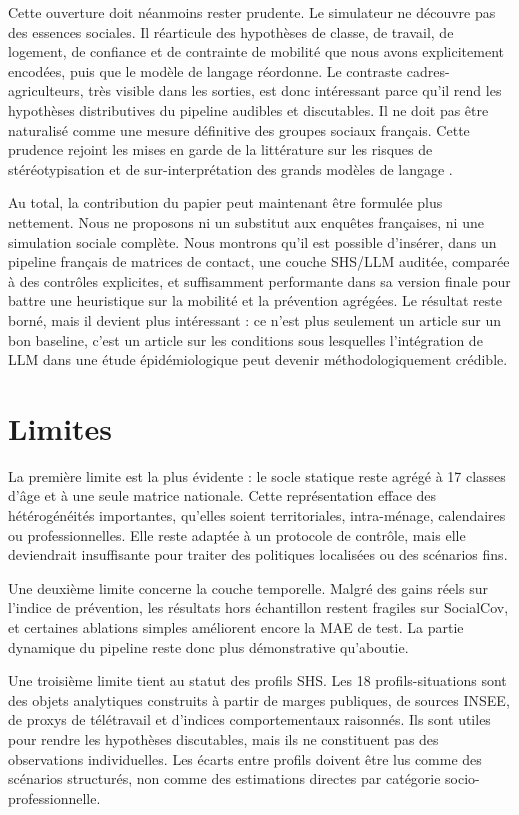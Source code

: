 \documentclass[ROIA,Unicode]{cedram}
\begin{document}
Cette ouverture doit néanmoins rester prudente. Le simulateur ne découvre pas des essences sociales. Il réarticule des hypothèses de classe, de travail, de logement, de confiance et de contrainte de mobilité que nous avons explicitement encodées, puis que le modèle de langage réordonne. Le contraste cadres-agriculteurs, très visible dans les sorties, est donc intéressant parce qu'il rend les hypothèses distributives du pipeline audibles et discutables. Il ne doit pas être naturalisé comme une mesure définitive des groupes sociaux français. Cette prudence rejoint les mises en garde de la littérature sur les risques de stéréotypisation et de sur-interprétation des grands modèles de langage \citep{weidinger2022taxonomy,bender2021stochastic}.

Au total, la contribution du papier peut maintenant être formulée plus nettement. Nous ne proposons ni un substitut aux enquêtes françaises, ni une simulation sociale complète. Nous montrons qu'il est possible d'insérer, dans un pipeline français de matrices de contact, une couche SHS/LLM auditée, comparée à des contrôles explicites, et suffisamment performante dans sa version finale pour battre une heuristique sur la mobilité et la prévention agrégées. Le résultat reste borné, mais il devient plus intéressant : ce n'est plus seulement un article sur un bon baseline, c'est un article sur les conditions sous lesquelles l'intégration de LLM dans une étude épidémiologique peut devenir méthodologiquement crédible.

\section{Limites}
La première limite est la plus évidente : le socle statique reste agrégé à 17 classes d'âge et à une seule matrice nationale. Cette représentation efface des hétérogénéités importantes, qu'elles soient territoriales, intra-ménage, calendaires ou professionnelles. Elle reste adaptée à un protocole de contrôle, mais elle deviendrait insuffisante pour traiter des politiques localisées ou des scénarios fins.

Une deuxième limite concerne la couche temporelle. Malgré des gains réels sur l'indice de prévention, les résultats hors échantillon restent fragiles sur SocialCov, et certaines ablations simples améliorent encore la MAE de test. La partie dynamique du pipeline reste donc plus démonstrative qu'aboutie.

Une troisième limite tient au statut des profils SHS. Les 18 profils-situations sont des objets analytiques construits à partir de marges publiques, de sources INSEE, de proxys de télétravail et d'indices comportementaux raisonnés. Ils sont utiles pour rendre les hypothèses discutables, mais ils ne constituent pas des observations individuelles. Les écarts entre profils doivent être lus comme des scénarios structurés, non comme des estimations directes par catégorie socio-professionnelle.
\end{document}

